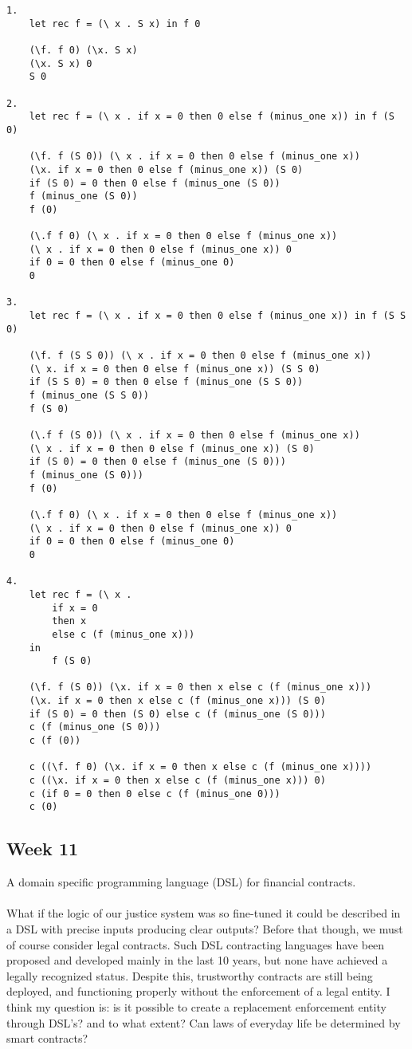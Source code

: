 \documentclass{article}
\theoremstyle{theorem}
\theoremstyle{definition}
\theoremstyle{remark}
\begin{document}
\begin{verbatim}
1.
    let rec f = (\ x . S x) in f 0

    (\f. f 0) (\x. S x)
    (\x. S x) 0
    S 0

2.
    let rec f = (\ x . if x = 0 then 0 else f (minus_one x)) in f (S 0)

    (\f. f (S 0)) (\ x . if x = 0 then 0 else f (minus_one x))
    (\x. if x = 0 then 0 else f (minus_one x)) (S 0)
    if (S 0) = 0 then 0 else f (minus_one (S 0)) 
    f (minus_one (S 0))
    f (0) 

    (\.f f 0) (\ x . if x = 0 then 0 else f (minus_one x))
    (\ x . if x = 0 then 0 else f (minus_one x)) 0
    if 0 = 0 then 0 else f (minus_one 0)
    0

3.
    let rec f = (\ x . if x = 0 then 0 else f (minus_one x)) in f (S S 0)

    (\f. f (S S 0)) (\ x . if x = 0 then 0 else f (minus_one x))
    (\ x. if x = 0 then 0 else f (minus_one x)) (S S 0)
    if (S S 0) = 0 then 0 else f (minus_one (S S 0))
    f (minus_one (S S 0))
    f (S 0)

    (\.f f (S 0)) (\ x . if x = 0 then 0 else f (minus_one x))
    (\ x . if x = 0 then 0 else f (minus_one x)) (S 0)
    if (S 0) = 0 then 0 else f (minus_one (S 0))) 
    f (minus_one (S 0))) 
    f (0)

    (\.f f 0) (\ x . if x = 0 then 0 else f (minus_one x))
    (\ x . if x = 0 then 0 else f (minus_one x)) 0
    if 0 = 0 then 0 else f (minus_one 0)
    0

4.
    let rec f = (\ x . 
        if x = 0 
        then x 
        else c (f (minus_one x))) 
    in 
        f (S 0)

    (\f. f (S 0)) (\x. if x = 0 then x else c (f (minus_one x)))
    (\x. if x = 0 then x else c (f (minus_one x))) (S 0)
    if (S 0) = 0 then (S 0) else c (f (minus_one (S 0)))
    c (f (minus_one (S 0)))
    c (f (0))

    c ((\f. f 0) (\x. if x = 0 then x else c (f (minus_one x))))
    c ((\x. if x = 0 then x else c (f (minus_one x))) 0)
    c (if 0 = 0 then 0 else c (f (minus_one 0)))
    c (0)
\end{verbatim}

\subsection{Week 11}

A domain specific programming language (DSL) for financial contracts.
\\\\
What if the logic of our justice system was so fine-tuned it could be described in a DSL with precise inputs producing clear outputs? Before that though, we must of course consider legal contracts. Such DSL contracting languages have been proposed and developed mainly in the last 10 years, but none have achieved a legally recognized status. Despite this, trustworthy contracts are still being deployed, and functioning properly without the enforcement of a legal entity. I think my question is: is it possible to create a replacement enforcement entity through DSL's? and to what extent? Can laws of everyday life be determined by smart contracts?
\end{document}
